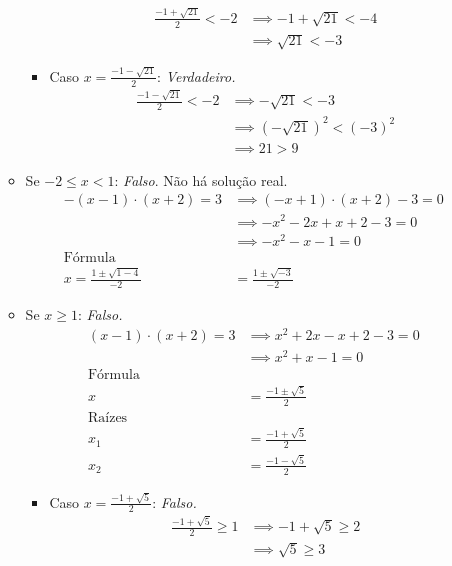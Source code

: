 \begin{enumerate}
\begin{itemize}
\begin{itemize}
\begin{align*}
                \frac{-1 + \sqrt{21}}{2} < -2 & \implies -1 + \sqrt{21} < -4 \\ & \implies
                \sqrt{21} < -3
            \end{align*}
            \item Caso $x = \frac{-1 - \sqrt{21}}{2}$: \emph{Verdadeiro.}
            \begin{align*}
                \frac{-1 - \sqrt{21}}{2} < -2 & \implies - \sqrt{21} < -3 
                \\ & \implies
                (-\sqrt{21})^2 < (-3)^2 \\ & \implies 21 > 9
            \end{align*}
        \end{itemize}
        \item Se $-2 \le x < 1$: \emph{Falso}. Não há solução real.
        \begin{align*}
            -(x-1) \cdot (x+2) = 3 & \implies
            (-x + 1) \cdot (x + 2) - 3 = 0 \\ & \implies
            -x^2 -2x +x + 2 - 3 = 0 \\ & \implies
            -x^2 -x - 1 = 0
            \\ \text{Fórmula} \\
            x = \frac{1 \pm \sqrt{1 - 4}}{-2} & = \frac{1 \pm \sqrt{-3}}{-2}
        \end{align*}
        \item Se $x \ge 1$: \emph{Falso.}
        \begin{align*}
            (x - 1) \cdot (x +2) = 3 & \implies x^2 +2x - x + 2 - 3 = 0 \\ & \implies
            x^2 + x - 1 = 0
            \\ \text{Fórmula} \\
            x &= \frac{-1 \pm \sqrt{5}}{2}
            \\ \text{Raízes} \\
            x_1 &= \frac{-1 + \sqrt{5}}{2} \\
            x_2 &= \frac{-1 - \sqrt{5}}{2}
        \end{align*}
        \begin{itemize}
            \item Caso $x = \frac{-1 + \sqrt{5}}{2}$: \emph{Falso.}
            \begin{align*}
                \frac{-1 + \sqrt{5}}{2} \ge 1 & \implies -1 + \sqrt{5} \ge 2
                \\ & \implies \sqrt{5} \ge 3

\end{align*}
\end{itemize}
\end{itemize}
\end{enumerate}
